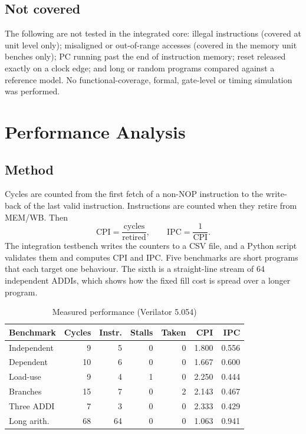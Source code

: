\documentclass[conference]{IEEEtran}
\begin{document}
\subsection{Not covered}
The following are not tested in the integrated core: illegal instructions (covered at unit level only); misaligned or out-of-range accesses (covered in the memory unit benches only); PC running past the end of instruction memory; reset released exactly on a clock edge; and long or random programs compared against a reference model. No functional-coverage, formal, gate-level or timing simulation was performed.

\section{Performance Analysis}
\label{sec:perf}

\subsection{Method}
Cycles are counted from the first fetch of a non-NOP instruction to the write-back of the last valid instruction. Instructions are counted when they retire from MEM/WB. Then
\[
\text{CPI} = \frac{\text{cycles}}{\text{retired}}, \qquad \text{IPC} = \frac{1}{\text{CPI}}.
\]
The integration testbench writes the counters to a CSV file, and a Python script validates them and computes CPI and IPC. Five benchmarks are short programs that each target one behaviour. The sixth is a straight-line stream of 64 independent ADDIs, which shows how the fixed fill cost is spread over a longer program.

\begin{table}[t]
\centering
\caption{Measured performance (Verilator 5.054)}
\label{tab:perf}
\footnotesize
\setlength{\tabcolsep}{4pt}
\begin{tabular}{@{}lrrrrrr@{}}
\toprule
Benchmark & Cycles & Instr. & Stalls & Taken & CPI & IPC \\
\midrule
Independent & 9  & 5 & 0 & 0 & 1.800 & 0.556 \\
Dependent   & 10 & 6 & 0 & 0 & 1.667 & 0.600 \\
Load-use    & 9  & 4 & 1 & 0 & 2.250 & 0.444 \\
Branches    & 15 & 7 & 0 & 2 & 2.143 & 0.467 \\
Three ADDI  & 7  & 3 & 0 & 0 & 2.333 & 0.429 \\
Long arith.\ & 68 & 64 & 0 & 0 & 1.063 & 0.941 \\
\bottomrule
\end{tabular}
\end{table}
\end{document}
